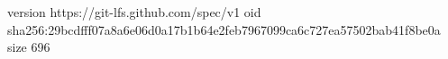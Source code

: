 version https://git-lfs.github.com/spec/v1
oid sha256:29bcdfff07a8a6e06d0a17b1b64e2feb7967099ca6c727ea57502bab41f8be0a
size 696
